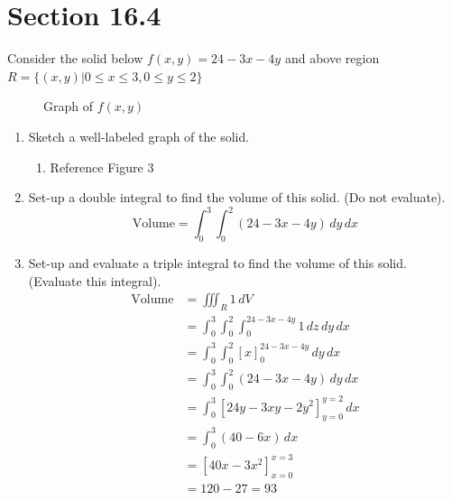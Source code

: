 \documentclass[letter,11pt]{article}
\begin{document}
\section*{Section 16.4}
Consider the solid below $f(x,y)=24-3x-4y$ and above region $R = \{(x, y)| 0 \leq x \leq 3, 0 \leq y \leq 2\}$
\begin{figure}[h]
	\centering
        \caption{Graph of $f(x,y)$}
\end{figure}
\begin{enumerate}[label = \roman*.]
	\item Sketch a well-labeled graph of the solid.
            \begin{enumerate}
                \item Reference Figure 3
            \end{enumerate}
	\item Set-up a double integral to find the volume of this solid. (Do not evaluate).
        $$\text{Volume} = \boxed{\int_{0}^{3}\int_{0}^{2} \left(24-3x-4y\right)\, dy\,dx}$$
	\item Set-up and evaluate a triple integral to find the volume of this solid. (Evaluate this integral).
        \begin{align*}
            \text{Volume} &= \iiint_{R} 1 \, d V \\
            &= \int_{0}^{3}\int_{0}^{2} \int_{0}^{24-3x-4y} 1 \, dz\, dy\, dx\\
            &= \int_{0}^{3}\int_{0}^{2} [x]_{0}^{24-3x-4y} \, dy\, dx\\
            &= \int_{0}^{3}\int_{0}^{2} \left(24-3x-4y\right)\, dy\,dx\\
            &= \int_{0}^{3} \left[24y-3xy-2y^2\right]_{y=0}^{y=2} \,dx\\
            &= \int_{0}^{3}\left(40-6x\right) \, dx\\
            &= \left[40x-3x^2\right]_{x=0}^{x=3} \\
            &= 120- 27 = \boxed{93}
        \end{align*}

\end{enumerate}
\newpage
\end{document}
